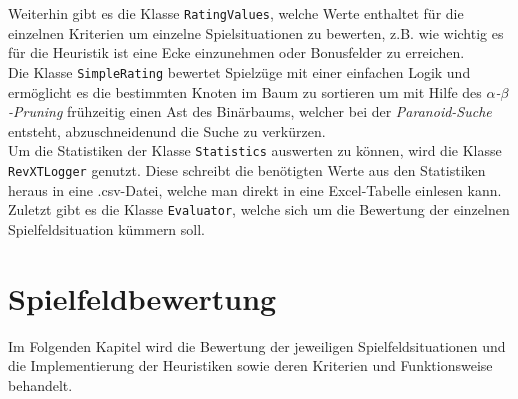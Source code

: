\documentclass[12pt,a4paper,bibliography=totocnumbered,listof=totocnumbered,ngerman]{scrartcl}
\begin{document}
Weiterhin gibt es die Klasse \texttt{RatingValues}, welche Werte enthaltet für die einzelnen Kriterien um einzelne Spielsituationen zu bewerten, z.B. wie wichtig es für die Heuristik ist eine Ecke einzunehmen oder Bonusfelder zu erreichen. \\
Die Klasse \texttt{SimpleRating} bewertet Spielzüge mit einer einfachen Logik und ermöglicht es die bestimmten Knoten im Baum zu sortieren um mit Hilfe des \emph{$\alpha$-$\beta$-Pruning} frühzeitig einen Ast des Binärbaums, welcher bei der \emph{Paranoid-Suche} entsteht, \glqq abzuschneiden\grqq und die Suche zu verkürzen. \\
Um die Statistiken der Klasse \texttt{Statistics} auswerten zu können, wird die Klasse  \texttt{RevXTLogger} genutzt. Diese schreibt die benötigten Werte aus den Statistiken heraus in eine .csv-Datei, welche man direkt in eine Excel-Tabelle einlesen kann.\\
Zuletzt gibt es die Klasse \texttt{Evaluator}, welche sich um die Bewertung der einzelnen Spielfeldsituation kümmern soll.




\newpage
\section{Spielfeldbewertung}
Im Folgenden Kapitel wird die Bewertung der jeweiligen Spielfeldsituationen und die Implementierung der Heuristiken sowie deren Kriterien und Funktionsweise behandelt.
\end{document}
